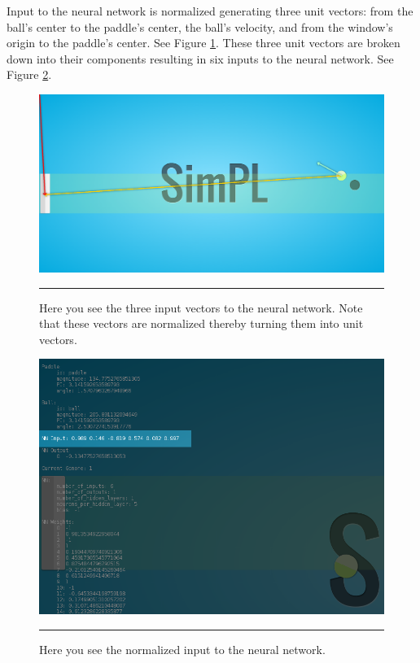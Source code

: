 Input to the neural network is normalized generating three unit vectors: from the ball's center to the paddle's center, the ball's velocity, and from the window's origin to the paddle's center. See Figure \ref{fig:unit_vectors}. These three unit vectors are broken down into their components resulting in six inputs to the neural network. See Figure \ref{fig:nn_input}. 

\begin{figure}[htbp]  
  \centering
  \includegraphics[scale=0.21]{../Figures/Chapter3/unit_vectors.png}
  \rule{35em}{0.5pt}
  \caption[SimPL NN Input Vectors]{Here you see the three input vectors to the neural network. Note that these vectors are normalized thereby turning them into unit vectors.}
  \label{fig:unit_vectors}
\end{figure}

\begin{figure}[htbp]  
  \centering
  \includegraphics[scale=0.5]{../Figures/Chapter3/nn_input.png}
  \rule{35em}{0.5pt}
  \caption[SimPL NN Input Tuple]{Here you see the normalized input to the neural network.}
  \label{fig:nn_input}
\end{figure}

